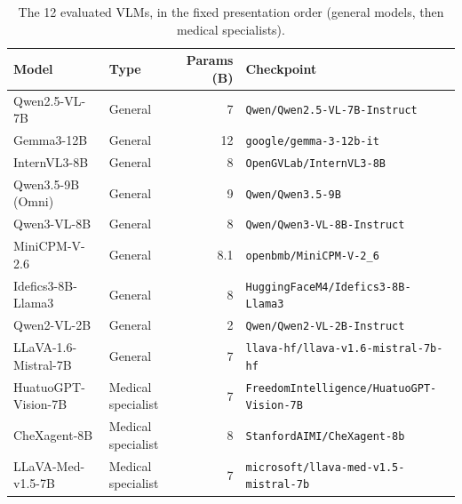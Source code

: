 \begin{table}[t]
\centering
\small
\begin{tabular}{llrl}
\toprule
Model & Type & Params (B) & Checkpoint \\
\midrule
Qwen2.5-VL-7B & General & 7 & \texttt{Qwen/Qwen2.5-VL-7B-Instruct} \\
Gemma3-12B & General & 12 & \texttt{google/gemma-3-12b-it} \\
InternVL3-8B & General & 8 & \texttt{OpenGVLab/InternVL3-8B} \\
Qwen3.5-9B (Omni) & General & 9 & \texttt{Qwen/Qwen3.5-9B} \\
Qwen3-VL-8B & General & 8 & \texttt{Qwen/Qwen3-VL-8B-Instruct} \\
MiniCPM-V-2.6 & General & 8.1 & \texttt{openbmb/MiniCPM-V-2\_6} \\
Idefics3-8B-Llama3 & General & 8 & \texttt{HuggingFaceM4/Idefics3-8B-Llama3} \\
Qwen2-VL-2B & General & 2 & \texttt{Qwen/Qwen2-VL-2B-Instruct} \\
LLaVA-1.6-Mistral-7B & General & 7 & \texttt{llava-hf/llava-v1.6-mistral-7b-hf} \\
HuatuoGPT-Vision-7B & Medical specialist & 7 & \texttt{FreedomIntelligence/HuatuoGPT-Vision-7B} \\
CheXagent-8B & Medical specialist & 8 & \texttt{StanfordAIMI/CheXagent-8b} \\
LLaVA-Med-v1.5-7B & Medical specialist & 7 & \texttt{microsoft/llava-med-v1.5-mistral-7b} \\
\bottomrule
\end{tabular}
\caption{The 12 evaluated VLMs, in the fixed presentation order (general models, then medical specialists).}
\label{tab:models}
\end{table}
